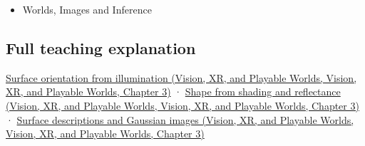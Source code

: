 \begin{itemize}
\tightlist
\item
  {Worlds, Images and Inference}
\end{itemize}

\subsection{Full teaching explanation}\label{appendix-89b2d5b7c9e1-full-teaching-explanation}

\href{../07-Vision-XR-and-Playable-Worlds/main.pdf\#nameddest=04-visual-computing-ii-ch032-surface-orientation-from-illumination}{Surface orientation from illumination (Vision, XR, and Playable Worlds, Vision, XR, and Playable Worlds, Chapter 3)} · \href{../07-Vision-XR-and-Playable-Worlds/main.pdf\#nameddest=04-visual-computing-ii-ch032-shape-from-shading-and-reflectance}{Shape from shading and reflectance (Vision, XR, and Playable Worlds, Vision, XR, and Playable Worlds, Chapter 3)} · \href{../07-Vision-XR-and-Playable-Worlds/main.pdf\#nameddest=04-visual-computing-ii-ch032-surface-descriptions-and-gaussian-images}{Surface descriptions and Gaussian images (Vision, XR, and Playable Worlds, Vision, XR, and Playable Worlds, Chapter 3)}
